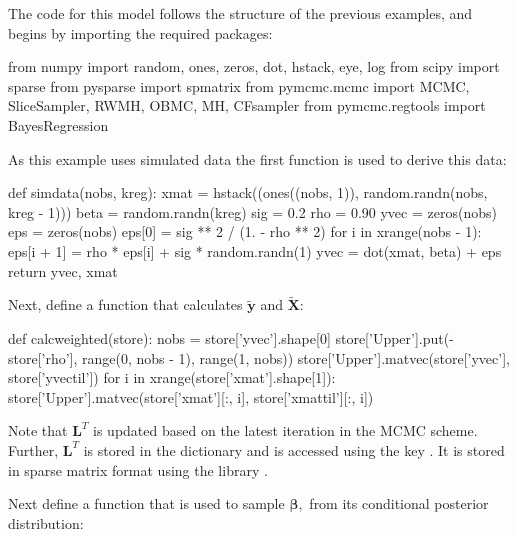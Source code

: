 \documentclass[article]{jss}
\begin{document}
The code for this model follows the structure of the previous
examples, and begins by importing the required packages:




\begin{Code}
from numpy import random, ones, zeros, dot, hstack, eye, log
from scipy import sparse
from pysparse import spmatrix
from pymcmc.mcmc import MCMC, SliceSampler, RWMH, OBMC, MH, CFsampler
from pymcmc.regtools import BayesRegression 
\end{Code}

As this example uses simulated data the first function is used to
derive this data:

\begin{Code}
def simdata(nobs, kreg):
    xmat = hstack((ones((nobs, 1)), random.randn(nobs, kreg - 1)))
    beta = random.randn(kreg)
    sig = 0.2
    rho = 0.90
    yvec = zeros(nobs)
    eps = zeros(nobs)
    eps[0] = sig ** 2 / (1. - rho ** 2)
    for i in xrange(nobs - 1):
        eps[i + 1] = rho * eps[i] + sig * random.randn(1)
    yvec = dot(xmat, beta) + eps
    return yvec, xmat
\end{Code}

Next, define a function that calculates $\tilde{\bm{y}}$ and
$\bm{\tilde{X}}$:


\begin{Code}
def calcweighted(store):
    nobs = store['yvec'].shape[0]
    store['Upper'].put(-store['rho'], range(0, nobs - 1), range(1, nobs))
    store['Upper'].matvec(store['yvec'], store['yvectil'])
    for i in xrange(store['xmat'].shape[1]):
        store['Upper'].matvec(store['xmat'][:, i], store['xmattil'][:, i])

\end{Code}
 Note that $\bm{L}^{T}$ is updated based on the
latest iteration in the MCMC scheme. Further, $\bm{L}^{T}$ is stored
in the  dictionary  and is accessed using
the key . It is stored in sparse matrix format using the
library .

Next define a function that is used to sample $\bm{\beta},$ from its
conditional posterior distribution:
\end{document}
